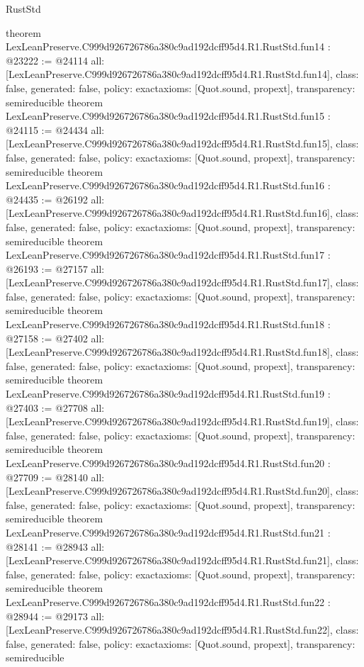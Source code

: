 \begin{lexlean}{RustStd}
\begin{coremodule}
{}
theorem LexLeanPreserve.C999d926726786a380c9ad192dcff95d4.R1.RustStd.fun14 : @23222 := @24114 {
  all: [LexLeanPreserve.C999d926726786a380c9ad192dcff95d4.R1.RustStd.fun14],
  class: false,
  generated: false,
  policy: exact{axioms: [Quot.sound, propext]},
  transparency: semireducible
}
theorem LexLeanPreserve.C999d926726786a380c9ad192dcff95d4.R1.RustStd.fun15 : @24115 := @24434 {
  all: [LexLeanPreserve.C999d926726786a380c9ad192dcff95d4.R1.RustStd.fun15],
  class: false,
  generated: false,
  policy: exact{axioms: [Quot.sound, propext]},
  transparency: semireducible
}
theorem LexLeanPreserve.C999d926726786a380c9ad192dcff95d4.R1.RustStd.fun16 : @24435 := @26192 {
  all: [LexLeanPreserve.C999d926726786a380c9ad192dcff95d4.R1.RustStd.fun16],
  class: false,
  generated: false,
  policy: exact{axioms: [Quot.sound, propext]},
  transparency: semireducible
}
theorem LexLeanPreserve.C999d926726786a380c9ad192dcff95d4.R1.RustStd.fun17 : @26193 := @27157 {
  all: [LexLeanPreserve.C999d926726786a380c9ad192dcff95d4.R1.RustStd.fun17],
  class: false,
  generated: false,
  policy: exact{axioms: [Quot.sound, propext]},
  transparency: semireducible
}
theorem LexLeanPreserve.C999d926726786a380c9ad192dcff95d4.R1.RustStd.fun18 : @27158 := @27402 {
  all: [LexLeanPreserve.C999d926726786a380c9ad192dcff95d4.R1.RustStd.fun18],
  class: false,
  generated: false,
  policy: exact{axioms: [Quot.sound, propext]},
  transparency: semireducible
}
theorem LexLeanPreserve.C999d926726786a380c9ad192dcff95d4.R1.RustStd.fun19 : @27403 := @27708 {
  all: [LexLeanPreserve.C999d926726786a380c9ad192dcff95d4.R1.RustStd.fun19],
  class: false,
  generated: false,
  policy: exact{axioms: [Quot.sound, propext]},
  transparency: semireducible
}
theorem LexLeanPreserve.C999d926726786a380c9ad192dcff95d4.R1.RustStd.fun20 : @27709 := @28140 {
  all: [LexLeanPreserve.C999d926726786a380c9ad192dcff95d4.R1.RustStd.fun20],
  class: false,
  generated: false,
  policy: exact{axioms: [Quot.sound, propext]},
  transparency: semireducible
}
theorem LexLeanPreserve.C999d926726786a380c9ad192dcff95d4.R1.RustStd.fun21 : @28141 := @28943 {
  all: [LexLeanPreserve.C999d926726786a380c9ad192dcff95d4.R1.RustStd.fun21],
  class: false,
  generated: false,
  policy: exact{axioms: [Quot.sound, propext]},
  transparency: semireducible
}
theorem LexLeanPreserve.C999d926726786a380c9ad192dcff95d4.R1.RustStd.fun22 : @28944 := @29173 {
  all: [LexLeanPreserve.C999d926726786a380c9ad192dcff95d4.R1.RustStd.fun22],
  class: false,
  generated: false,
  policy: exact{axioms: [Quot.sound, propext]},
  transparency: semireducible
}
\end{coremodule}
\end{lexlean}

